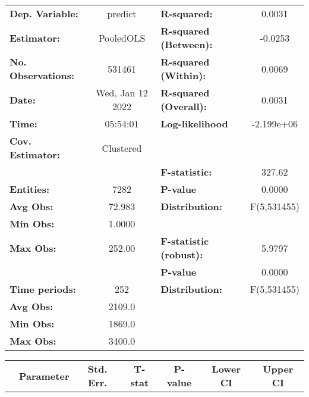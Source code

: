 \begin{center}
\begin{tabular}{lclc}
\toprule
\textbf{Dep. Variable:}    &      predict       & \textbf{  R-squared:         }   &      0.0031      \\
\textbf{Estimator:}        &     PooledOLS      & \textbf{  R-squared (Between):}  &     -0.0253      \\
\textbf{No. Observations:} &       531461       & \textbf{  R-squared (Within):}   &      0.0069      \\
\textbf{Date:}             &  Wed, Jan 12 2022  & \textbf{  R-squared (Overall):}  &      0.0031      \\
\textbf{Time:}             &      05:54:01      & \textbf{  Log-likelihood     }   &    -2.199e+06    \\
\textbf{Cov. Estimator:}   &     Clustered      & \textbf{                     }   &                  \\
\textbf{}                  &                    & \textbf{  F-statistic:       }   &      327.62      \\
\textbf{Entities:}         &        7282        & \textbf{  P-value            }   &      0.0000      \\
\textbf{Avg Obs:}          &       72.983       & \textbf{  Distribution:      }   &   F(5,531455)    \\
\textbf{Min Obs:}          &       1.0000       & \textbf{                     }   &                  \\
\textbf{Max Obs:}          &       252.00       & \textbf{  F-statistic (robust):} &      5.9797      \\
\textbf{}                  &                    & \textbf{  P-value            }   &      0.0000      \\
\textbf{Time periods:}     &        252         & \textbf{  Distribution:      }   &   F(5,531455)    \\
\textbf{Avg Obs:}          &       2109.0       & \textbf{                     }   &                  \\
\textbf{Min Obs:}          &       1869.0       & \textbf{                     }   &                  \\
\textbf{Max Obs:}          &       3400.0       & \textbf{                     }   &                  \\
\bottomrule
\end{tabular}
\begin{tabular}{lcccccc}
                & \textbf{Parameter} & \textbf{Std. Err.} & \textbf{T-stat} & \textbf{P-value} & \textbf{Lower CI} & \textbf{Upper CI}  \\

\end{tabular}
\end{center}
